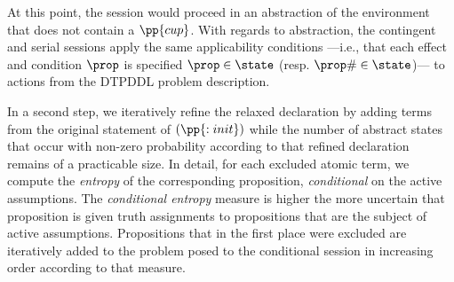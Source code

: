 \noindent At this point, the session would proceed in an
abstraction of the environment that does not contain a
$\pp{cup}$. With regards to abstraction, the contingent and serial
sessions apply the same applicability conditions ---i.e., that each
effect and condition $\prop$ is specified $\prop\in\state$
(resp. $\prop\#\in\state$)--- to actions from the DTPDDL problem
description.

In a second step, we iteratively refine the relaxed declaration by
adding terms from the original statement of $(\pp{:init})$ while the
number of abstract states that occur with non-zero probability
according to that refined declaration remains of a practicable
size. In detail, for each excluded atomic term, we compute the {\em
entropy} of the corresponding proposition, {\em conditional} on the
active assumptions. The {\em conditional entropy} measure
is higher the more uncertain that proposition is given truth
assignments to propositions that are the subject of active
assumptions. Propositions that in the first place were excluded are
iteratively added to the problem posed to the conditional session in
increasing order according to that measure. 










